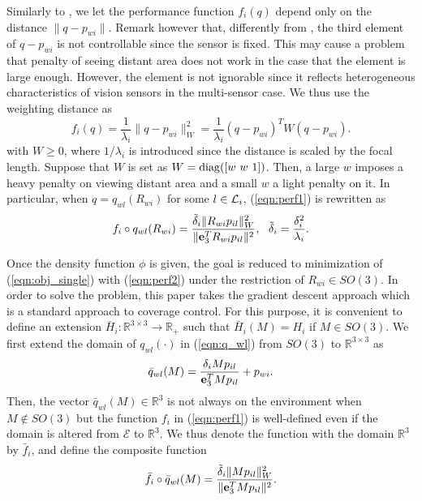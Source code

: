 \documentclass[conference,letterpaper]{ieeeconf}
\newcommand{\E}{{\mathcal E}}
\newcommand{\R}{{\mathbb R}}
\newcommand{\diag}{{\rm diag}}
\newcommand{\ewi}{R_{wi}}
\renewcommand{\L}{{\cal L}}
\begin{document}
Similarly to \cite{BCM_BK09}, we let
the performance function $f_i(q)$ depend only on the distance $\|q - p_{wi}\|$.
Remark however that, differently from \cite{BCM_BK09}, 
the third element of $q - p_{wi}$ is not controllable
since the sensor is fixed.
This may cause a problem that penalty of seeing distant area
does not work in the case that the element is large enough.
However, the element is not ignorable since it reflects heterogeneous 
characteristics of vision sensors in the multi-sensor case.
We thus use the weighting distance as
\begin{equation}
f_i(q) = \frac{1}{\lambda_i} \|q - p_{wi}\|_{W}^2 = \frac{1}{\lambda_i}(q-p_{wi})^TW(q - p_{wi}).
\label{eqn:perf1}
\end{equation}
with $W \geq 0$, where $1/\lambda_i$ is introduced 
since the distance is scaled by the focal length. 
Suppose that $W$ is set as $W = \diag([w\ w\ 1])$.
Then, a large $w$ imposes a heavy penalty on viewing distant area
and a small $w$ a light penalty on it.
In particular, when $q = q_{wl}(\ewi)$ for some $l \in \L_i$,
(\ref{eqn:perf1}) is rewritten as
\begin{equation}
f_i \circ q_{wl}(\ewi) 
= \frac{ \tilde \delta_i \|\ewi p_{il}\|_W^2}{\|{\bf e}_3^T \ewi p_{il}\|^2},\ \
\tilde \delta_i = \frac{\delta_i^2}{\lambda_i}.
\label{eqn:perf2}
\end{equation}


Once the density function $\phi$ is given,
the goal is reduced to minimization of
(\ref{eqn:obj_single}) with (\ref{eqn:perf2})
under the restriction of $\ewi \in SO(3)$.
In order to solve the problem,
this paper takes the gradient descent approach
which is a standard approach to coverage control.
For this purpose,
it is convenient to define an extension $\bar H_i: \R^{3 \times 3} \to \R_+$
such that $\bar H_i(M) = H_i$ if $M \in SO(3)$.
We first extend the domain
of $q_{wl}(\cdot)$ in (\ref{eqn:q_wl}) from $SO(3)$
to $\R^{3 \times 3}$ as
\begin{equation}
\bar q_{wl}(M) = 
\frac{\delta_i M p_{il}}{{\bf e}_3^T M p_{il}} + p_{wi}.
\label{eqn:arxiv2}
\end{equation}
Then, the vector $\bar q_{wl}(M) \in \R^3$ is not always 
on the environment when $M \notin SO(3)$ but
the function $f_i$ in (\ref{eqn:perf1}) is well-defined
even if the domain is altered from $\E$ to $\R^3$. 
We thus denote the function with the domain $\R^3$ by $\bar f_i$,
and define the composite function 
\begin{equation}
\bar{f}_i \circ \bar q_{wl}(M) = 
\frac{ \tilde \delta_i \|Mp_{il}\|_W^2}{\|{\bf e}_3^T M p_{il}\|^2}.
\label{eqn:perf5}
\end{equation}
\end{document}
